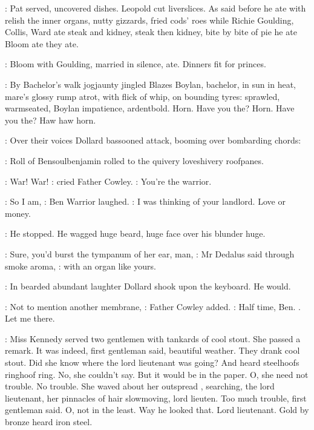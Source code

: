 :
Pat served, uncovered dishes. Leopold cut liverslices.
As said before he ate with relish the inner organs,
nutty gizzards, fried cods' roes while
Richie Goulding, Collis, Ward ate steak and kidney, steak then kidney,
bite by bite of pie he ate Bloom ate they ate.

:
Bloom with Goulding, married in silence, ate.
Dinners fit for princes.

:
By Bachelor's walk jogjaunty jingled Blazes Boylan, bachelor, in sun
in heat, mare's glossy rump atrot, with flick of whip, on bounding tyres:
sprawled, warmseated, Boylan impatience, ardentbold. Horn. Have you
the? Horn. Have you the? Haw haw horn.

:
Over their voices Dollard bassooned attack, booming over bombarding
chords:


:
Roll of Bensoulbenjamin rolled to the
quivery loveshivery roofpanes.

\cowley:
War! War!
:
cried Father Cowley.
\cowley:
You're the warrior.

\dollard:
So I am,
:
Ben Warrior laughed.
\dollard:
I was thinking of your landlord. Love or money.

:
He stopped. He wagged huge beard,
huge face over his blunder huge.

\simon:
Sure, you'd burst the tympanum of her ear, man,
:
Mr Dedalus said through smoke aroma,
\simon:
with an organ like yours.

:
In bearded abundant laughter Dollard shook upon the keyboard.
He would.

\cowley:
Not to mention another membrane,
:
Father Cowley added.
\cowley:
Half time, Ben. .
Let me there.

:
Miss Kennedy served two gentlemen with tankards of cool stout. She
passed a remark. It was indeed, first gentleman said, beautiful weather.
They drank cool stout. Did she know where the lord lieutenant was going?
And heard steelhoofs ringhoof ring. No, she couldn't say. But it would be
in the paper. O, she need not trouble. No trouble. She waved about her
outspread , searching,
the lord lieutenant, her pinnacles of
hair slowmoving, lord lieuten. Too much trouble, first gentleman said. O,
not in the least. Way he looked that. Lord lieutenant. Gold by bronze
heard iron steel.%


